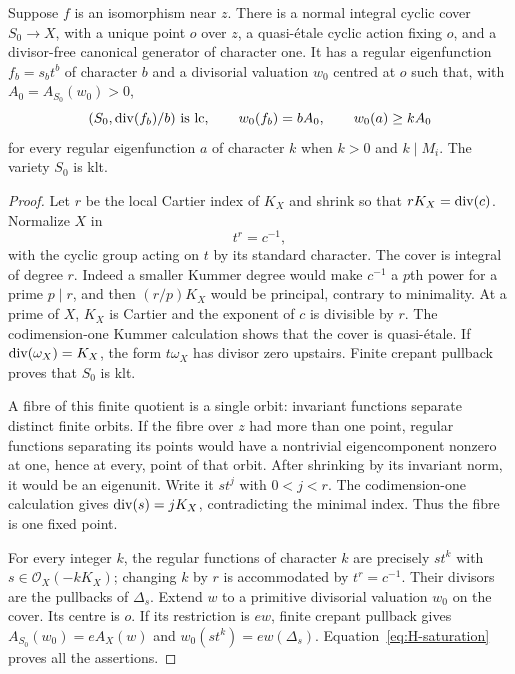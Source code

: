 \begin{lemma}\label{lem:H-canonical-cover}
Suppose $f$ is an isomorphism near $z$.  There is a normal integral
cyclic cover $S_0\to X$, with a unique point $o$ over $z$, a
quasi-\'{e}tale cyclic action fixing $o$, and a divisor-free canonical
generator of character one.  It has a regular eigenfunction
$f_b=s_bt^b$ of character $b$ and a divisorial valuation $w_0$ centred
at $o$ such that, with $A_0=A_{S_0}(w_0)>0$,
\begin{equation}\label{eq:H-upstairs-saturation}
 (S_0,\operatorname{div}(f_b)/b)\text{ is lc},\qquad
 w_0(f_b)=bA_0,\qquad
 w_0(a)\ge kA_0
\end{equation}
for every regular eigenfunction $a$ of character $k$ when
$k>0$ and $k\mid M_i$.  The variety $S_0$ is klt.
\end{lemma}
\begin{proof}
Let $r$ be the local Cartier index of $K_X$ and shrink so that
$rK_X=\operatorname{div}(c)$.  Normalize $X$ in
\[
 t^r=c^{-1},
\]
with the cyclic group acting on $t$ by its standard character.  The cover
is integral of degree $r$.  Indeed a smaller Kummer degree would make
$c^{-1}$ a $p$th power for a prime $p\mid r$, and then
$(r/p)K_X$ would be principal, contrary to minimality.  At a prime of
$X$, $K_X$ is Cartier and the exponent of $c$ is divisible by $r$.
The codimension-one Kummer calculation shows that the cover is
quasi-\'{e}tale.  If $\operatorname{div}(\omega_X)=K_X$, the form
$t\omega_X$ has divisor zero upstairs.  Finite crepant pullback proves
that $S_0$ is klt.

A fibre of this finite quotient is a single orbit: invariant functions
separate distinct finite orbits.  If the fibre over $z$ had more than one
point, regular functions separating its points would have a nontrivial
eigencomponent nonzero at one, hence at every, point of that orbit.
After shrinking by its invariant norm, it would be an eigenunit.  Write
it $s t^j$ with $0<j<r$.  The codimension-one calculation gives
$\operatorname{div}(s)=jK_X$, contradicting the minimal index.  Thus the fibre is
one fixed point.

For every integer $k$, the regular functions of character $k$ are
precisely $s t^k$ with $s\in\mathcal O_X(-kK_X)$; changing $k$ by
$r$ is accommodated by $t^r=c^{-1}$.  Their divisors are the pullbacks
of $\Delta_s$.  Extend $w$ to a primitive divisorial valuation $w_0$
on the cover.  Its centre is $o$.  If its restriction is $e w$, finite
crepant pullback gives $A_{S_0}(w_0)=eA_X(w)$ and
$w_0(s t^k)=e w(\Delta_s)$.  Equation~\eqref{eq:H-saturation} proves
all the assertions.
\end{proof}

